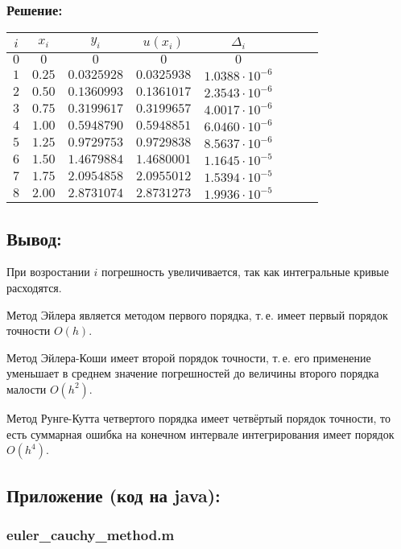\documentclass[a4paper,10pt,notitlepage,pdftex]{scrartcl}
\begin{document}
\subsubsection*{Решение:}
\begin{tabular}{|c|c|c|c|c|c|c|c|}
\hline
$i$	& $x_i$		& $y_i$			& $u(x_i)$		& $\Delta_i$\\
\hline
$0$	& $0$		& $0$			& $0$			& $0$\\
$1$	& $0.25$	& $0.0325928$	& $0.0325938$	& $1.0388\cdot 10^{-6}$\\
$2$	& $0.50$	& $0.1360993$	& $0.1361017$	& $2.3543\cdot 10^{-6}$\\
$3$	& $0.75$	& $0.3199617$	& $0.3199657$	& $4.0017\cdot 10^{-6}$\\
$4$	& $1.00$	& $0.5948790$	& $0.5948851$	& $6.0460\cdot 10^{-6}$\\
$5$	& $1.25$	& $0.9729753$	& $0.9729838$	& $8.5637\cdot 10^{-6}$\\
$6$	& $1.50$	& $1.4679884$	& $1.4680001$	& $1.1645\cdot 10^{-5}$\\
$7$	& $1.75$	& $2.0954858$	& $2.0955012$	& $1.5394\cdot 10^{-5}$\\
$8$	& $2.00$	& $2.8731074$	& $2.8731273$	& $1.9936\cdot 10^{-5}$\\
\hline
\end{tabular}

\subsection*{Вывод:}
При возростании $i$ погрешность увеличивается, так как интегральные кривые расходятся. 

Метод Эйлера является методом первого порядка, т.\,е. имеет первый порядок точности $O(h)$. 

Метод Эйлера-Коши имеет второй порядок точности, т.\,е. его применение уменьшает в среднем значение погрешностей до величины второго порядка малости $O(h^2)$. 

Метод Рунге-Кутта четвертого порядка имеет четвёртый порядок точности, то есть суммарная ошибка на конечном интервале интегрирования имеет порядок $O(h^4)$.

\subsection*{Приложение (код на java):}
\subsubsection*{euler\_cauchy\_method.m}
\end{document}
